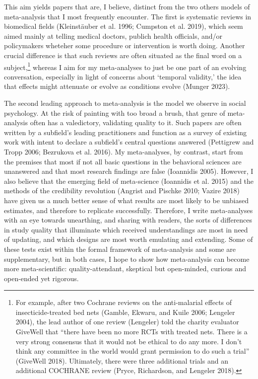 \documentclass{article}
\begin{document}
This aim yields papers that are, I believe, distinct from the two others
models of meta-analysis that I most frequently encounter. The first is
systematic reviews in biomedical fields (Kleinstäuber et al. 1996;
Cumpston et al. 2019), which seem aimed mainly at telling medical
doctors, publich health officials, and/or policymakers wheteher some
procedure or intervention is worth doing. Another crucial difference is
that such reviews are often situated as the final word on a
subject,\footnote{For example, after two Cochrane reviews on the
  anti-malarial effects of insecticide-treated bed nets (Gamble, Ekwaru,
  and Kuile 2006; Lengeler 2004), the lead author of one review
  (Lengeler) told the charity evaluator GiveWell that ``there have been
  no more RCTs with treated nets. There is a very strong consensus that
  it would not be ethical to do any more. I don't think any committee in
  the world would grant permission to do such a trial'' (GiveWell 2018).
  Ultimately, there were three additional trials and an additional
  COCHRANE review (Pryce, Richardson, and Lengeler 2018).} whereas I aim
for my meta-analyses to just be one part of an evolving conversation,
especially in light of concerns about `temporal validity,' the idea that
effects might attenuate or evolve as conditions evolve (Munger 2023).

The second leading approach to meta-analysis is the model we observe in
social psychology. At the risk of painting with too broad a brush, that
genre of meta-analysis often has a valedictory, validating quality to
it. Such papers are often written by a subfield's leading practitioners
and function as a survey of existing work with intent to declare a
subfield's central questions answered (Pettigrew and Tropp 2006;
Bezrukova et al. 2016). My meta-analyses, by contrast, start from the
premises that most if not all basic questions in the behavioral sciences
are unanswered and that most research findings are false (Ioannidis
2005). However, I also believe that the emerging field of meta-science
(Ioannidis et al. 2015) and the methods of the credibility revolution
(Angrist and Pischke 2010; Vazire 2018) have given us a much better
sense of what results are most likely to be unbiased estimates, and
therefore to replicate successfully. Therefore, I write meta-analyses
with an eye towards unearthing, and sharing with readers, the sorts of
differences in study quality that illuminate which received
understandings are most in need of updating, and which designs are most
worth emulating and extending. Some of these tests exist within the
formal framework of meta-analysis and some are supplementary, but in
both cases, I hope to show how meta-analysis can become more
meta-scientific: quality-attendant, skeptical but open-minded, curious
and open-ended yet rigorous.
\end{document}
